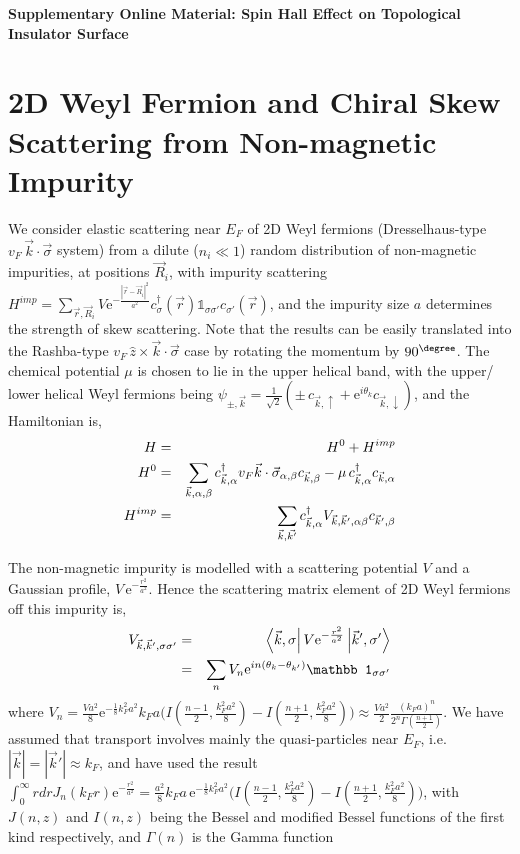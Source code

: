 \documentclass[letter,12pt,preprint,aps]{revtex4-1}
\newcommand{\ba}{\begin{eqnarray}}
\newcommand{\ea}{\end{eqnarray}}
\newcommand{\dg}{^{\dagger}}
\newcommand{\mI}{{\mathbb 1}}
\newcommand{\me}{\mathrm{e}}
\begin{document}
\centerline{\bf
Supplementary Online Material: Spin Hall Effect on Topological Insulator Surface}

\author{T.~Tzen Ong}
\date{\today}


\tableofcontents

\section{2D Weyl Fermion and Chiral Skew Scattering from Non-magnetic Impurity}

We consider elastic scattering near $E_F$ of 2D Weyl fermions (Dresselhaus-type $v_F \, \vec{k} \cdot \vec{\sigma}$ system) from a dilute ($n_i \ll 1$) random distribution of non-magnetic impurities, at positions $\vec{R}_i$, with impurity scattering $H^{imp} = \sum_{\vec{r}, \vec{R}_i} V \mathrm{e}^{-\frac{|\vec{r}-\vec{R}_i|^2}{a^2}} c\dg_{\sigma}(\vec{r})  \mI_{\sigma \sigma'} c_{\sigma'}(\vec{r})$, and the impurity size $a$ determines the strength of skew scattering. Note that the results can be easily translated into the Rashba-type $v_F \, \hat{z} \times \vec{k} \cdot \vec{\sigma}$ case by rotating the momentum by $90^{\degree}$. The chemical potential $\mu$ is chosen to lie in the upper helical band, with the upper/ lower helical Weyl fermions being $\psi_{\pm, \vec{k}} = \tfrac{1}{\sqrt{2}} (\pm \, c_{\vec{k}, \uparrow} + \me^{i \theta_k} c_{\vec{k}, \downarrow})$,  and the Hamiltonian is,
%
\ba
\label{eqn: Hamiltonian}
H & = & H^0 + H^{imp} \\
H^0 & = & \sum_{\vec{k}, \alpha, \beta} c\dg_{\vec{k}, \alpha}  v_F  \vec{k} \cdot \vec{\sigma}_{\alpha, \beta} c_{\vec{k}, \beta} - \mu \, c\dg_{\vec{k}, \alpha} c_{\vec{k}, \alpha} \cr
H^{imp} & = & \sum_{\vec{k}, \vec{k'}} c\dg_{\vec{k}, \alpha} V_{\vec{k}, \vec{k}', \alpha \beta} c_{\vec{k}', \beta} 
\ea

The non-magnetic impurity is modelled with a scattering potential $V$ and a Gaussian profile, $V \, \me^{-\frac{r^2}{a^2}}$. Hence the scattering matrix element of 2D Weyl fermions off this impurity is,
%
\ba
V_{\vec{k}, \vec{k}', \sigma \sigma'} & = & \bra{\vec{k}, \sigma} V \me^{-\frac{r^2}{a^2}} \ket{\vec{k}', \sigma'} \cr
 & = & \sum_n V_n \me^{i n (\theta_{k} - \theta_{k'})} \mI_{\sigma \sigma'}
 \ea 
%
where $V_n = \tfrac{V a^2}{8} \me^{-\frac{1}{8} k_F^2 a^2} k_F a \Big( I(\tfrac{n-1}{2}, \tfrac{k_F^2 a^2}{8}) - I(\tfrac{n+1}{2}, \tfrac{k_F^2 a^2}{8}) \Big) \approx \tfrac{V a^2}{2} \frac{(k_F a)^n}{2^n \Gamma(\tfrac{n+1}{2})}$. We have assumed that transport involves mainly the quasi-particles near $E_F$, i.e. $|\vec{k}| = |\vec{k}'| \approx k_F$, and have used the result $\int_{0}^{\infty} r dr J_n(k_F r) \me^{-\tfrac{r^2}{a^2}} =  \tfrac{a^2}{8}  k_F a \, \me^{-\frac{1}{8} k_F^2 a^2} \Big( I(\tfrac{n-1}{2}, \tfrac{k_F^2 a^2}{8}) - I(\tfrac{n+1}{2}, \tfrac{k_F^2 a^2}{8}) \Big)$, with $J(n,z)$ and $I(n,z)$ being the Bessel and modified Bessel functions of the first kind respectively, and $\Gamma(n)$ is the Gamma function
\end{document}
